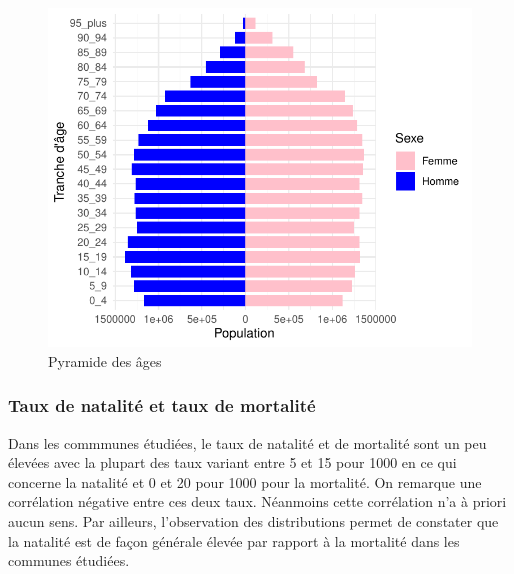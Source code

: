 \documentclass[
]{article}
\begin{document}
\begin{figure}

{\centering \includegraphics{rapport_intermediaire_files/figure-latex/unnamed-chunk-16-1} 

}

\caption{Pyramide des âges}\label{fig:unnamed-chunk-16}
\end{figure}

\hypertarget{taux-de-natalituxe9-et-taux-de-mortalituxe9}{%
\subsubsection{Taux de natalité et taux de
mortalité}\label{taux-de-natalituxe9-et-taux-de-mortalituxe9}}

Dans les commmunes étudiées, le taux de natalité et de mortalité sont un
peu élevées avec la plupart des taux variant entre 5 et 15 pour 1000 en
ce qui concerne la natalité et 0 et 20 pour 1000 pour la mortalité. On
remarque une corrélation négative entre ces deux taux. Néanmoins cette
corrélation n'a à priori aucun sens. Par ailleurs, l'observation des
distributions permet de constater que la natalité est de façon générale
élevée par rapport à la mortalité dans les communes étudiées.
\end{document}
